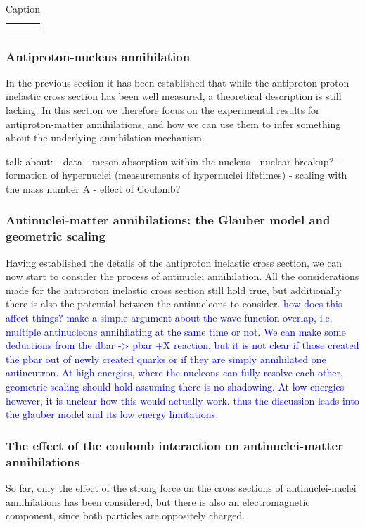 \begin{table}[]
    \centering
    \begin{tabular}{|c|c|c|}
         &  \\
         & 
    \end{tabular}
    \caption{Caption}
    \label{tab:pbarp_ann_data}
\end{table}

\subsubsection{Antiproton-nucleus annihilation}
In the previous section it has been established that while the antiproton-proton inelastic cross section has been well measured, a theoretical description is still lacking. In this section we therefore focus on the experimental results for antiproton-matter annihilations, and how we can use them to infer something about the underlying annihilation mechanism. 

talk about:
- data
- meson absorption within the nucleus
- nuclear breakup?
- formation of hypernuclei (measurements of hypernuclei lifetimes)
- scaling with the mass number A
- effect of Coulomb?
\subsubsection{Antinuclei-matter annihilations: the Glauber model and geometric scaling}\label{sec:IntroGlauber}
Having established the details of the antiproton inelastic cross section, we can now start to consider the process of antinuclei annihilation. All the considerations made for the antiproton inelastic cross section still hold true, but additionally there is also the potential between the antinucleons to consider. \textcolor{blue}{how does this affect things? make a simple argument about the wave function overlap, i.e. multiple antinucleons annihilating at the same time or not. We can make some deductions from the dbar -> pbar +X reaction, but it is not clear if those created the pbar out of newly created quarks or if they are simply annihilated one antineutron. At high energies, where the nucleons can fully resolve each other, geometric scaling should hold assuming there is no shadowing. At low energies however, it is unclear how this would actually work. thus the discussion leads into the glauber model and its low energy limitations.}

\subsubsection{The effect of the coulomb interaction on antinuclei-matter annihilations}
So far, only the effect of the strong force on the cross sections of antinuclei-nuclei annihilations has been considered, but there is also an electromagnetic component, since both particles are oppositely charged. 


